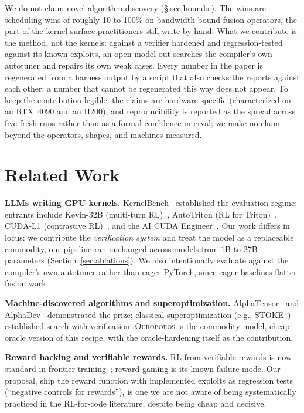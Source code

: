 \documentclass[10pt]{article}
\newcommand{\sys}{\textsc{Ouroboros}}
\begin{document}
We do not claim novel algorithm discovery (\S\ref{sec:bounds}). The wins are scheduling wins
of roughly 10 to 100\% on bandwidth-bound fusion operators, the part of the kernel surface
practitioners still write by hand. What we contribute is the method, not the kernels:
against a verifier hardened and regression-tested against its known exploits, an open model
out-searches the
compiler's own autotuner and repairs its own weak cases. Every number in the paper is regenerated from a harness output by a
script that also checks the reports against each other; a number that cannot be regenerated
this way does not appear. To keep the contribution legible: the claims are hardware-specific
(characterized on an RTX~4090 and an H200), and reproducibility is reported as the spread
across five fresh runs rather than as a formal confidence interval; we make no claim beyond
the operators, shapes, and machines measured.

\section{Related Work}

\textbf{LLMs writing GPU kernels.} KernelBench~\cite{kernelbench} established the
evaluation regime; entrants include Kevin-32B (multi-turn RL)~\cite{kevin}, AutoTriton
(RL for Triton)~\cite{autotriton}, CUDA-L1 (contrastive RL)~\cite{cudal1}, and the AI
CUDA Engineer~\cite{sakana2025}. Our work differs in locus: we contribute the
\emph{verification system} and treat the model as a replaceable commodity, our pipeline
ran unchanged across models from 1B to 27B parameters (Section~\ref{sec:ablations}). We also intentionally evaluate against the
compiler's own autotuner rather than eager PyTorch, since eager baselines flatter fusion
work.

\textbf{Machine-discovered algorithms and superoptimization.} AlphaTensor~\cite{alphatensor}
and AlphaDev~\cite{alphadev} demonstrated the prize; classical superoptimization (e.g.,
STOKE~\cite{stoke}) established search-with-verification. \sys{} is the commodity-model,
cheap-oracle version of this recipe, with the oracle-hardening itself as the contribution.

\textbf{Reward hacking and verifiable rewards.} RL from verifiable rewards is now standard
in frontier training~\cite{deepseekmath,tulu3}; reward gaming is its known failure mode.
Our proposal, ship the reward function with implemented exploits as regression tests
(``negative controls for rewards''), is one we are not aware of being systematically
practiced in the RL-for-code literature, despite being cheap and decisive.
\end{document}
